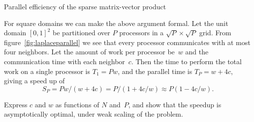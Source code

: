  {Parallel efficiency of the sparse matrix-vector product}
\label{sec:par-spmvp}

For square domains we can make the above argument formal.
Let the
unit domain $[0,1]^2$ be partitioned over $P$ processors in a $\sqrt
P\times \sqrt P$ grid. From figure~\ref{fig:laplaceparallel} we see
that every processor communicates with at most four neighbors. Let
the amount of work per processor be~$w$ and the communication time
with each neighbor~$c$. Then the time to perform the total work on a
single processor is $T_1=Pw$, and the parallel time is $T_P=w+4c$,
giving a speed up of
\[ S_P=Pw/(w+4c)=P/(1+4c/w)\approx P(1-4c/w). \]

\begin{exercise}
  Express $c$ and $w$ as functions of $N$ and~$P$, and show that the
  speedup is asymptotically optimal, under weak scaling of the problem.
\end{exercise}

